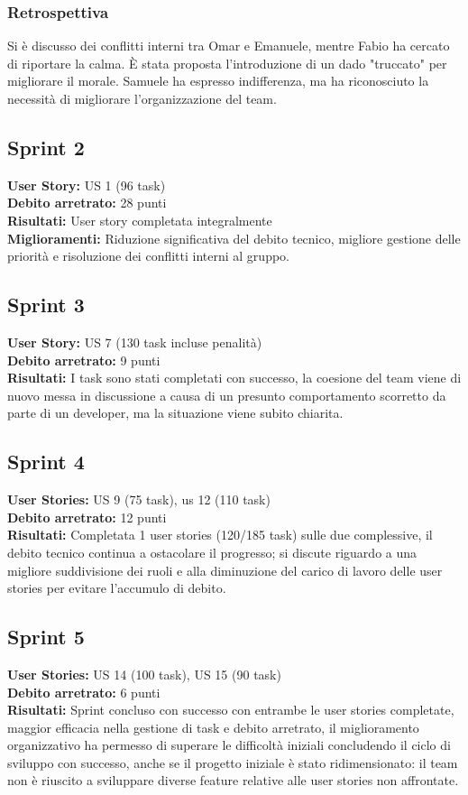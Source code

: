 \documentclass{article}
\begin{document}
\subsubsection*{Retrospettiva}  
Si è discusso dei conflitti interni tra Omar e Emanuele, mentre Fabio ha cercato di riportare la calma. È stata proposta l'introduzione di un dado "truccato" per migliorare il morale. Samuele ha espresso indifferenza, ma ha riconosciuto la necessità di migliorare l’organizzazione del team.


\subsection*{Sprint 2}
\textbf{User Story:} US 1 (96 task)\\
\textbf{Debito arretrato:} 28 punti\\
\textbf{Risultati:} User story completata integralmente\\
\textbf{Miglioramenti:} Riduzione significativa del debito tecnico, migliore gestione delle priorità e risoluzione dei conflitti interni al gruppo.

\subsection*{Sprint 3}
\textbf{User Story:} US 7 (130 task incluse penalità)\\
\textbf{Debito arretrato:} 9 punti\\
\textbf{Risultati:} I task sono stati completati con successo, la coesione del team viene di nuovo messa in discussione a causa di un presunto comportamento scorretto da parte di un developer, ma la situazione viene subito chiarita.

\subsection*{Sprint 4}
\textbf{User Stories:} US 9 (75 task), us 12 (110 task)\\
\textbf{Debito arretrato:} 12 punti\\
\textbf{Risultati:} Completata 1 user stories (120/185 task) sulle due complessive, il debito tecnico continua a ostacolare il progresso; si discute riguardo a una migliore suddivisione dei ruoli e alla diminuzione del carico di lavoro delle user stories per evitare l'accumulo di debito.

\subsection*{Sprint 5}
\textbf{User Stories:} US 14 (100 task), US 15 (90 task)\\
\textbf{Debito arretrato:} 6 punti\\
\textbf{Risultati:} Sprint concluso con successo con entrambe le user stories completate, maggior efficacia nella gestione di task e debito arretrato, il miglioramento organizzativo ha permesso di superare le difficoltà iniziali concludendo il ciclo di sviluppo con successo, anche se il progetto iniziale è stato ridimensionato: il team non è riuscito a sviluppare diverse feature relative alle user stories non affrontate.
\end{document}
